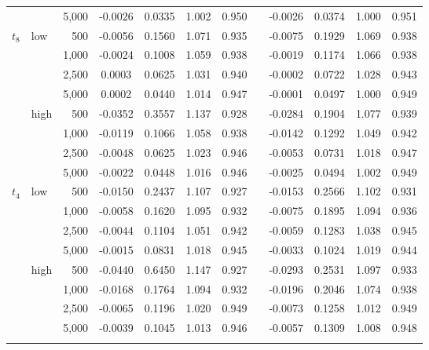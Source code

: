 \begin{table}[t]
\begin{adjustbox}{width=1\textwidth}
\begin{tabular}{llr*{9}{c}}
 &  & 5,000 & -0.0026 & 0.0335 & 1.002 & 0.950 && -0.0026 & 0.0374 & 1.000 & 0.951\\
\addlinespace[3pt]
$t_8$ & low & 500 & -0.0056 & 0.1560 & 1.071 & 0.935 && -0.0075 & 0.1929 & 1.069 & 0.938\\
 &  & 1,000 & -0.0024 & 0.1008 & 1.059 & 0.938 && -0.0019 & 0.1174 & 1.066 & 0.938\\
 &  & 2,500 & 0.0003 & 0.0625 & 1.031 & 0.940 && -0.0002 & 0.0722 & 1.028 & 0.943\\
 &  & 5,000 & 0.0002 & 0.0440 & 1.014 & 0.947 && -0.0001 & 0.0497 & 1.000 & 0.949\\
\addlinespace[1pt]
 & high & 500 & -0.0352 & 0.3557 & 1.137 & 0.928 && -0.0284 & 0.1904 & 1.077 & 0.939\\
 &  & 1,000 & -0.0119 & 0.1066 & 1.058 & 0.938 && -0.0142 & 0.1292 & 1.049 & 0.942\\
 &  & 2,500 & -0.0048 & 0.0625 & 1.023 & 0.946 && -0.0053 & 0.0731 & 1.018 & 0.947\\
 &  & 5,000 & -0.0022 & 0.0448 & 1.016 & 0.946 && -0.0025 & 0.0494 & 1.002 & 0.949\\
\addlinespace[3pt]
$t_4$ & low & 500 & -0.0150 & 0.2437 & 1.107 & 0.927 && -0.0153 & 0.2566 & 1.102 & 0.931\\
 &  & 1,000 & -0.0058 & 0.1620 & 1.095 & 0.932 && -0.0075 & 0.1895 & 1.094 & 0.936\\
 &  & 2,500 & -0.0044 & 0.1104 & 1.051 & 0.942 && -0.0059 & 0.1283 & 1.038 & 0.945\\
 &  & 5,000 & -0.0015 & 0.0831 & 1.018 & 0.945 && -0.0033 & 0.1024 & 1.019 & 0.944\\
\addlinespace[1pt]
 & high & 500 & -0.0440 & 0.6450 & 1.147 & 0.927 && -0.0293 & 0.2531 & 1.097 & 0.933\\
 &  & 1,000 & -0.0168 & 0.1764 & 1.094 & 0.932 && -0.0196 & 0.2046 & 1.074 & 0.938\\
 &  & 2,500 & -0.0065 & 0.1196 & 1.020 & 0.949 && -0.0073 & 0.1258 & 1.012 & 0.949\\
 &  & 5,000 & -0.0039 & 0.1045 & 1.013 & 0.946 && -0.0057 & 0.1309 & 1.008 & 0.948\\
\bottomrule
&\\
\end{tabular}
\end{adjustbox}\end{table}
